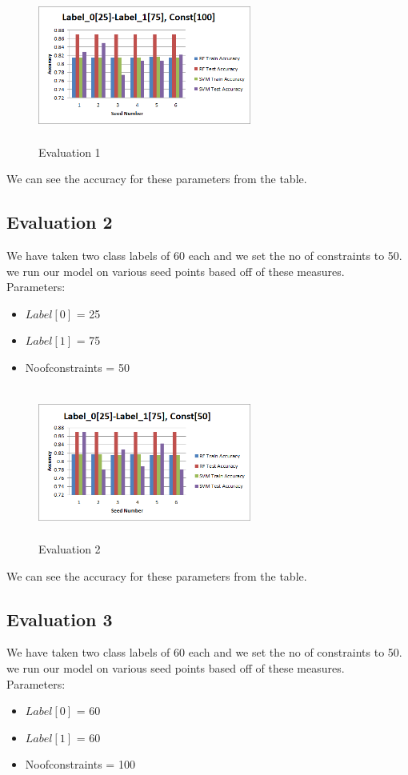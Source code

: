 \documentclass[10pt, conference, compsocconf]{IEEEtran}
\begin{document}
\begin{figure}[H]
\centering
\includegraphics[width=7cm,height=5cm,keepaspectratio]{1.png}
\caption{\label{fig:2-Evaluation 1} Evaluation 1}
\end{figure}

We can see the accuracy for these parameters from the table.



\subsection{Evaluation 2}
We have taken two class labels of 60 each and we set the no of constraints to 50.
we run our model on various seed points based off of these measures.\\
Parameters:
\begin{itemize}
\item $Label[0]$ = 25
\item $Label[1]$ = 75
\item Noofconstraints = 50
\end{itemize}

\begin{figure}[H]
\centering
\includegraphics[width=7cm,height=5cm,keepaspectratio]{2.png}
\caption{\label{fig:2-Evaluation 2} Evaluation 2}
\end{figure}

We can see the accuracy for these parameters from the table.

\subsection{Evaluation 3}
We have taken two class labels of 60 each and we set the no of constraints to 50.
we run our model on various seed points based off of these measures.\\
Parameters:
\begin{itemize}
\item $Label[0]$ = 60
\item $Label[1]$ = 60
\item Noofconstraints = 100
\end{itemize}
\end{document}
